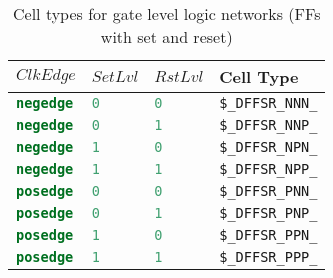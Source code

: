 \begin{table}[t]
\hfil
\begin{tabular}[t]{llll}
$ClkEdge$ & $SetLvl$ & $RstLvl$ & Cell Type \\
\hline
\lstinline[language=Verilog];negedge; & \lstinline[language=Verilog];0; & \lstinline[language=Verilog];0; & {\tt \$\_DFFSR\_NNN\_} \\
\lstinline[language=Verilog];negedge; & \lstinline[language=Verilog];0; & \lstinline[language=Verilog];1; & {\tt \$\_DFFSR\_NNP\_} \\
\lstinline[language=Verilog];negedge; & \lstinline[language=Verilog];1; & \lstinline[language=Verilog];0; & {\tt \$\_DFFSR\_NPN\_} \\
\lstinline[language=Verilog];negedge; & \lstinline[language=Verilog];1; & \lstinline[language=Verilog];1; & {\tt \$\_DFFSR\_NPP\_} \\
\lstinline[language=Verilog];posedge; & \lstinline[language=Verilog];0; & \lstinline[language=Verilog];0; & {\tt \$\_DFFSR\_PNN\_} \\
\lstinline[language=Verilog];posedge; & \lstinline[language=Verilog];0; & \lstinline[language=Verilog];1; & {\tt \$\_DFFSR\_PNP\_} \\
\lstinline[language=Verilog];posedge; & \lstinline[language=Verilog];1; & \lstinline[language=Verilog];0; & {\tt \$\_DFFSR\_PPN\_} \\
\lstinline[language=Verilog];posedge; & \lstinline[language=Verilog];1; & \lstinline[language=Verilog];1; & {\tt \$\_DFFSR\_PPP\_} \\
\end{tabular}
\caption{Cell types for gate level logic networks (FFs with set and reset)}
\label{tab:CellLib_gates_dffsr}
\end{table}

